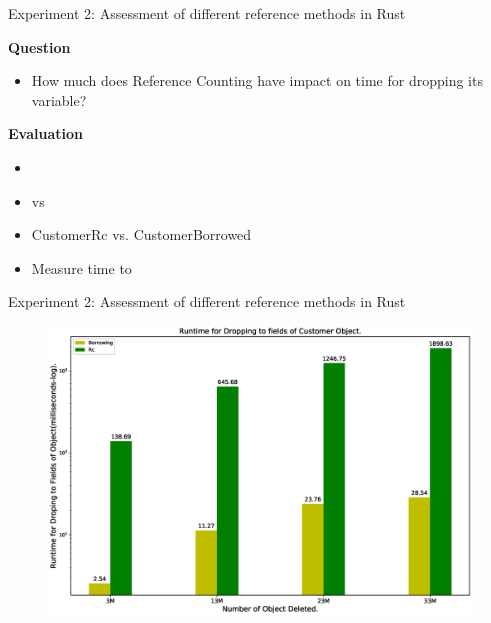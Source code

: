 \documentclass[9pt]{beamer}
\begin{document}

\begin{frame}[fragile]{Experiment 2: Assessment of different reference methods in Rust}

    \textbf{Question}
    \begin{itemize}
        \item How much does Reference Counting have impact on time for dropping its variable?
    \end{itemize}

    \vspace{0.5cm}

    \textbf{Evaluation}
    \begin{itemize}
        \item {}
        \item {} vs 
        \item CustomerRc vs. CustomerBorrowed
        \item Measure time to 
    \end{itemize}

\end{frame}



\begin{frame}[fragile]{Experiment 2: Assessment of different reference methods in Rust}

    \begin{figure}[hp]
        \centering
        \begin{center}
                \includegraphics[width=1\textwidth]{images/rust_droptime_borring_rc.eps}
                \captionsetup{labelformat=empty}
        \end{center}
    \end{figure}
\end{frame}
\end{document}

